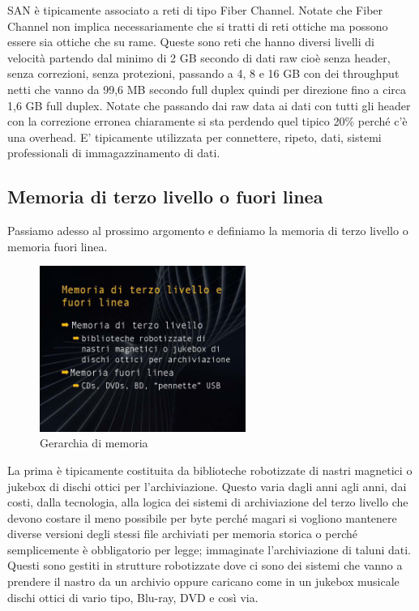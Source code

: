 SAN è tipicamente associato a reti di tipo Fiber Channel.
Notate che Fiber Channel non implica necessariamente che si tratti di reti ottiche ma possono essere sia ottiche che su rame.
Queste sono reti che hanno diversi livelli di velocità partendo dal minimo di 2 GB secondo di dati raw cioè senza header, senza correzioni, senza protezioni, passando a 4, 8 e 16 GB con dei throughput netti che vanno da 99,6 MB secondo full duplex quindi per direzione fino a circa 1,6 GB full duplex.
Notate che passando dai raw data ai dati con tutti gli header con la correzione erronea chiaramente si sta perdendo quel tipico 20\% perché c'è una overhead.
E' tipicamente utilizzata per connettere, ripeto, dati, sistemi professionali di immagazzinamento di dati.

\subsection{Memoria di terzo livello o fuori linea}

Passiamo adesso al prossimo argomento e definiamo la memoria di terzo livello o memoria fuori linea.

\FloatBarrier
\begin{figure}[H]
  \centering
  \includegraphics[width=0.60\textwidth,
                    trim=20 20 10 20, %
                    clip]
                    {images/Lez06_p02_fig_06.png}
  \caption{Gerarchia di memoria}
  \label{fig:Lez06_p02_fig_06}
\end{figure}
\FloatBarrier
\noindent

La prima è tipicamente costituita da biblioteche robotizzate di nastri magnetici o jukebox di dischi ottici per l'archiviazione.
Questo varia dagli anni agli anni, dai costi, dalla tecnologia, alla logica dei sistemi di archiviazione del terzo livello che devono costare il meno possibile per byte perché magari si vogliono mantenere diverse versioni degli stessi file archiviati per memoria storica o perché semplicemente è obbligatorio per legge; immaginate l'archiviazione di taluni dati.
Questi sono gestiti in strutture robotizzate dove ci sono dei sistemi che vanno a prendere il nastro da un archivio oppure caricano come in un jukebox musicale dischi ottici di vario tipo, Blu-ray, DVD e così via.

